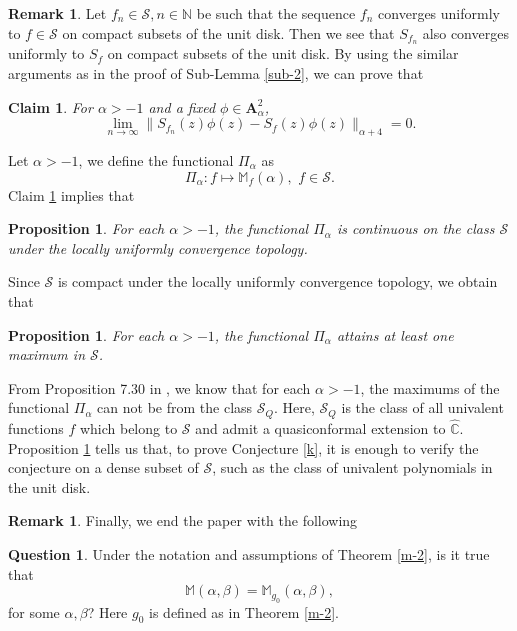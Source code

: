 \documentclass[10pt]{amsart}
\newtheorem{proposition}[theorem]{Proposition}
\newtheorem{claim}[theorem]{Claim}
\theoremstyle{definition}    %
\newtheorem{remark}[theorem]{Remark}
\newtheorem{question}[theorem]{Question}
\numberwithin{equation}{section}
\begin{document}
\begin{remark}Let $f_n\in \mathcal{S}, n\in\mathbb{N}$ be such that the sequence $f_n$ converges uniformly to $f\in \mathcal{S}$ on compact subsets of the unit disk. Then we see that $S_{f_n}$ also converges uniformly to $S_f$ on compact subsets of the unit disk.
By using the similar arguments as in the proof of Sub-Lemma \ref{sub-2}, we can prove that 
\begin{claim}\label{jia-p}
For $\alpha>-1$ and a fixed $\phi \in \mathbf{A}_{\alpha}^2$,  $$
\lim_{n \to \infty} \| S_{f_n}(z)\phi(z) - S_f(z)\phi(z) \|_{\alpha+4} = 0.$$
\end{claim}
Let $\alpha>-1$, we define the functional $\Pi_{\alpha}$ as
$$ \Pi_{\alpha}: f  \mapsto \mathbb{M}_f(\alpha),\,\, f\in \mathcal{S}.$$ 
Claim \ref{jia-p} implies that 
\begin{proposition}\label{jia-p-1}
For each $\alpha>-1$, the functional $\Pi_{\alpha}$ is continuous on the class $\mathcal{S}$ under the locally uniformly convergence topology. 
\end{proposition}
Since $\mathcal{S}$ is compact under the locally uniformly convergence topology, we obtain that   
\begin{proposition}\label{jia-p-2}
For each $\alpha>-1$, the functional $\Pi_{\alpha}$ attains at least one maximum in $\mathcal{S}$.
\end{proposition}
From Proposition 7.30 in \cite{Jin-c}, we know that for each $\alpha>-1$, the maximums of the functional $\Pi_{\alpha}$ can not be from the class $\mathcal{S}_{Q}$. 
Here, $\mathcal{S}_{Q}$ is the class of all univalent functions $f$ which belong to $\mathcal{S}$ and admit a quasiconformal extension to $\widehat{\mathbb{C}}$.  Proposition \ref{jia-p-1} tells us that, to prove Conjecture \ref{k}, it is enough to verify the conjecture on a dense subset of $\mathcal{S}$, such as the class of univalent polynomials in the unit disk.  
\end{remark}
\begin{remark}
Finally, we end the paper with the following
\begin{question}Under the notation and assumptions of Theorem \ref{m-2}, is it true that
$$\mathbb{M}(\alpha, \beta)=\mathbb{M}_{g_0}(\alpha,\beta),$$
for some $\alpha, \beta$? Here $g_0$ is defined as in Theorem \ref{m-2}.
\end{question}\end{remark}
\end{document}
